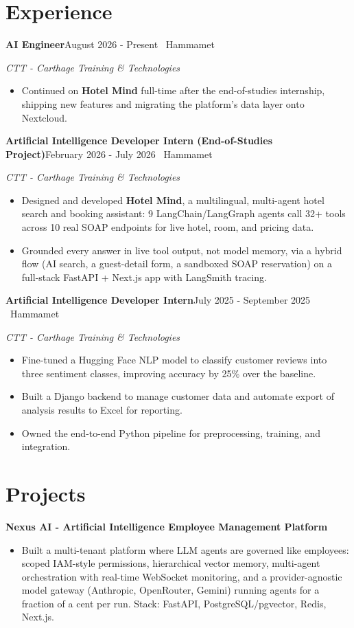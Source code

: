 \documentclass[11pt,a4paper]{article}
\newcommand{\entry}[2]{\textbf{#1}\hfill{\small\color{muted}#2}\par}
\newcommand{\org}[1]{{\itshape\color{muted}#1}\par}
\newcommand{\proj}[1]{\textbf{#1}\par}
\begin{document}
\section{Experience}
\entry{AI Engineer}{August 2026 - Present \textperiodcentered\ Hammamet}
\org{CTT - Carthage Training \& Technologies}
\begin{itemize}
  \item Continued on \textbf{Hotel Mind} full-time after the end-of-studies internship, shipping new features and migrating the platform's data layer onto Nextcloud.
\end{itemize}
\vspace{3pt}
\entry{Artificial Intelligence Developer Intern (End-of-Studies Project)}{February 2026 - July 2026 \textperiodcentered\ Hammamet}
\org{CTT - Carthage Training \& Technologies}
\begin{itemize}
  \item Designed and developed \textbf{Hotel Mind}, a multilingual, multi-agent hotel search and booking assistant: 9 LangChain/LangGraph agents call 32+ tools across 10 real SOAP endpoints for live hotel, room, and pricing data.
  \item Grounded every answer in live tool output, not model memory, via a hybrid flow (AI search, a guest-detail form, a sandboxed SOAP reservation) on a full-stack FastAPI + Next.js app with LangSmith tracing.
\end{itemize}
\vspace{3pt}
\entry{Artificial Intelligence Developer Intern}{July 2025 - September 2025 \textperiodcentered\ Hammamet}
\org{CTT - Carthage Training \& Technologies}
\begin{itemize}
  \item Fine-tuned a Hugging Face NLP model to classify customer reviews into three sentiment classes, improving accuracy by 25\% over the baseline.
  \item Built a Django backend to manage customer data and automate export of analysis results to Excel for reporting.
  \item Owned the end-to-end Python pipeline for preprocessing, training, and integration.
\end{itemize}

\section{Projects}

\proj{Nexus AI - Artificial Intelligence Employee Management Platform}
\begin{itemize}
  \item Built a multi-tenant platform where LLM agents are governed like employees: scoped IAM-style
        permissions, hierarchical vector memory, multi-agent orchestration with real-time WebSocket
        monitoring, and a provider-agnostic model gateway (Anthropic, OpenRouter, Gemini) running agents for
        a fraction of a cent per run. Stack: FastAPI, PostgreSQL/pgvector, Redis, Next.js.
\end{itemize}
\end{document}
